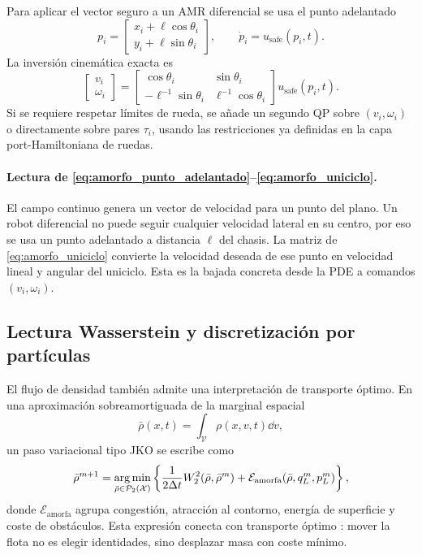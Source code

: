 Para aplicar el vector seguro a un AMR diferencial se usa el punto adelantado
\begin{equation}
  p_i=
  \begin{bmatrix}
    x_i+\ell\cos\theta_i\\
    y_i+\ell\sin\theta_i
  \end{bmatrix},
  \qquad
  \dot p_i=u_{\mathrm{safe}}(p_i,t).
  \label{eq:amorfo_punto_adelantado}
\end{equation}
La inversión cinemática exacta es
\begin{equation}
  \begin{bmatrix}
    v_i\\ \omega_i
  \end{bmatrix}
  =
  \begin{bmatrix}
    \cos\theta_i & \sin\theta_i\\
    -\ell^{-1}\sin\theta_i & \ell^{-1}\cos\theta_i
  \end{bmatrix}
  u_{\mathrm{safe}}(p_i,t).
  \label{eq:amorfo_uniciclo}
\end{equation}
Si se requiere respetar límites de rueda, se añade un segundo QP sobre
$(v_i,\omega_i)$ o directamente sobre pares $\tau_i$, usando las restricciones ya
definidas en la capa port-Hamiltoniana de ruedas.

\paragraph{Lectura de \eqref{eq:amorfo_punto_adelantado}--\eqref{eq:amorfo_uniciclo}.}
El campo continuo genera un vector de velocidad para un punto del plano. Un robot
diferencial no puede seguir cualquier velocidad lateral en su centro, por eso se usa un
punto adelantado a distancia $\ell$ del chasis. La matriz de
\eqref{eq:amorfo_uniciclo} convierte la velocidad deseada de ese punto en velocidad
lineal y angular del uniciclo. Esta es la bajada concreta desde la PDE a comandos
$(v_i,\omega_i)$.

\subsection{Lectura Wasserstein y discretización por partículas}
\label{subsec:amorfo-wasserstein}

El flujo de densidad también admite una interpretación de transporte óptimo. En una
aproximación sobreamortiguada de la marginal espacial
\begin{equation}
  \bar\rho(x,t)=\int_{\mathcal V}\rho(x,v,t)\dd v,
  \label{eq:amorfo_marginal}
\end{equation}
un paso variacional tipo JKO se escribe como
\begin{equation}
  \bar\rho^{m+1}
  =
  \operatorname*{arg\,min}_{\bar\rho\in\mathcal P_2(\mathcal X)}
  \left\{
    \frac{1}{2\Delta t}W_2^2(\bar\rho,\bar\rho^m)
    +
    \mathcal E_{\mathrm{amorfa}}(\bar\rho,q_L^m,p_L^m)
  \right\},
  \label{eq:amorfo_jko}
\end{equation}
donde $\mathcal E_{\mathrm{amorfa}}$ agrupa congestión, atracción al contorno, energía de
superficie y coste de obstáculos. Esta expresión conecta con transporte óptimo
\citep{villani2009optimal}: mover la flota no es elegir identidades, sino desplazar masa
con coste mínimo.

